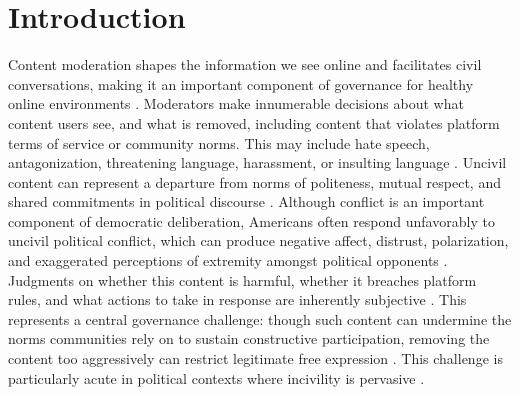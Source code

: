 \documentclass[12pt]{article}
\begin{document}
\vspace{1em}
\doublespacing 

\section{Introduction}

Content moderation shapes the information we see online and facilitates civil conversations, making it an important component of governance for healthy online environments \parencite{myerswestCensoredSuspendedShadowbanned2018,matiasCivicLaborVolunteer2019}. Moderators make innumerable decisions about what content users see, and what is removed, including content that violates platform terms of service or community norms. This may include hate speech, antagonization, threatening language, harassment, or insulting language \parencite{bonottiUnderstandingCivility2021,gervaisIncivilityInvalidityEvaluating2025,leibmannRedditRulesRulers2025}. Uncivil content can represent a departure from norms of politeness, mutual respect, and shared commitments in political discourse \parencite{bonottiUnderstandingCivility2021}. Although conflict is an important component of democratic deliberation, Americans often respond unfavorably to uncivil political conflict, which can produce negative affect, distrust, polarization, and exaggerated perceptions of extremity amongst political opponents \parencite{mutzInYourFacePoliticsConsequences2015}. Judgments on whether this content is harmful, whether it breaches platform rules, and what actions to take in response are inherently subjective \parencite{diakopoulosQualityDiscourseOnline2011,kozyrevaResolvingContentModeration2023}. This represents a central governance challenge: though such content can undermine the norms communities rely on to sustain constructive participation, removing the content too aggressively can restrict legitimate free expression \parencite{kozyrevaResolvingContentModeration2023}. This challenge is particularly acute in political contexts where incivility is pervasive \parencite{mutzInYourFacePoliticsConsequences2015}.
\end{document}
